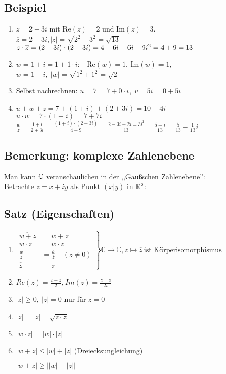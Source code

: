 \subsection{Beispiel}
\begin{enumerate}
	\item
	$z= 2+3i$ mit Re$(z)=2$ und Im$(z)=3$.\\
	$\overline{z} = 2-3i, |z|=\sqrt{2^2+3^2}= \sqrt{13}$\\
	$z \cdot \overline{z}=(2+3i)\cdot(2-3i)\\
	=4-6i+6i-9i^2
	=4+9=13$
	\item
	$w= 1+i = 1+1 \cdot i:\;\;$ Re$(w)=1$, Im$(w)=1$, $\overline{w}= 1-i,\; |w|=\sqrt{1^2+1^2}=\sqrt{2}$
	\item
	Selbst nachrechnen: $u=7=7+0 \cdot i,\; v= 5i=0+5i$
	\item
	$u+w+z = 7+ (1+i) + (2+3i) = 10 + 4i$\\
	$u \cdot w = 7 \cdot (1+i) = 7+7i$\\ 
	$ \frac{w}{z}= \frac{1+i}{2+3i}= \frac{(1+i)\cdot(2-3i)}{4+9} = \frac{2-3i+2i=3i^2}{13}= \frac{5-i}{13}=\frac{5}{13}-\frac{1}{13}i$
\end{enumerate}

\subsection{Bemerkung: komplexe Zahlenebene}
Man kann $\mathbb{C}$ veranschaulichen in der ,,Gaußschen Zahlenebene'':\\
Betrachte $z=x+iy$ als Punkt $(x|y)$ in $\mathbb{R}^2$:

\subsection{Satz (Eigenschaften)}


\begin{enumerate}
	\item %
	$\left.
	\begin{array}{cl}
	\overline{w+z} &= \overline{w} + \overline{z}\\
	\overline{w\cdot z} &= \overline{w} \cdot \overline{z}\\
	\overline{\frac{w}{z}} &= \frac{\overline{w}}{\overline{z}} \quad (z \neq 0)\\
	\overline{\overline{z}} &= z
	\end{array}
	\right\rbrace \mathbb{C} \rightarrow \mathbb{C}, z \mapsto \overline{z}\; \text{ist Körperisomorphismus}$
	
	\item %
	$Re(z) = \frac{z+\overline{z}}{2}, Im(z)= \frac{z - \overline{z}}{2i}$
	\item %
	$|z| \geq 0,\; |z| = 0$ nur für $z = 0$
	\item
	$|z| = |\overline{z}| = \sqrt{z \cdot \overline{z}}$
	\item
	$|w \cdot z| = |w| \cdot |z|$
	\item
	$|w + z| \leq |w|+|z|$ (Dreiecksungleichung)
	
	$|w + z| \geq \bigg | |w|-|z| \bigg |$
\end{enumerate}

